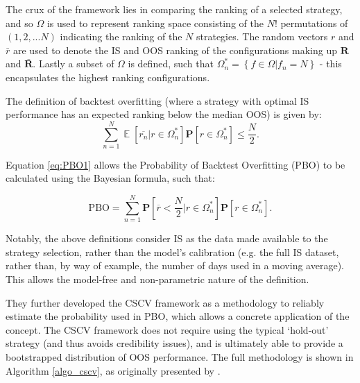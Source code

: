 \documentclass[a4paper,11pt,oneside]{article}
\DeclareMathOperator*{\E}{\mathbb{E}}
\theoremstyle{plain}
\theoremstyle{definition}
\begin{document}
	The crux of the framework lies in comparing the ranking of a selected strategy, and so $\Omega$ is used to represent ranking space consisting of the $N!$ permutations of $(1,2,...N)$ indicating the ranking of the $N$ strategies. The random vectors $r$ and $\bar{r}$ are used to denote the IS and OOS ranking of the configurations making up $\mathbf{R}$ and $\mathbf{\bar{R}}$. Lastly a subset of $\Omega$ is defined, such that $\Omega_{n}^{*}=\left\{f \in \Omega | f_{n}=N\right\}$ - this encapsulates the highest ranking configurations. \newline
	
	
	The definition of backtest overfitting (where a strategy with optimal IS performance has an expected ranking below the median OOS) is given by:
	\begin{equation}\label{eq:PBO1}
	\sum_{n=1}^{N}\mathbf{\E}[\overline{r_n}|r\in 
	\Omega_{n}^{*}]\mathbf{P}[r\in\Omega_{n}^{*}]\leq{\frac{N}{2}} .
	\end{equation}
	
	Equation \eqref{eq:PBO1} allows the Probability of Backtest Overfitting (PBO) to be calculated using the Bayesian formula, such that:
	
	\begin{equation}\label{eq:PBO2}
	\mathrm{PBO} = \sum_{n=1}^{N}\mathbf{P}[\overline{r} < {\frac{N}{2}}|r\in\Omega_{n}^{*}]\mathbf{P}[r\in\Omega_{n}^{*}] .
	\end{equation}
	
	Notably, the above definitions consider IS as the data made available to the strategy selection, rather than the 
	model's calibration (e.g. the full IS dataset, rather than, by way of example, the number of days used in a moving average). 
	This allows the model-free and non-parametric nature of the definition. 
	\hfill \break 
	
	They further developed the CSCV framework as a methodology to reliably estimate the probability used in PBO, which allows a concrete application of the concept. The CSCV framework does not require using the typical ‘hold-out’ strategy (and thus avoids credibility issues), and is ultimately able to provide a bootstrapped distribution of OOS performance. The full methodology is shown in Algorithm \ref{algo_cscv}, as originally presented by \citet{BailyPBO}.
	\hfill \break 
	
\end{document}
